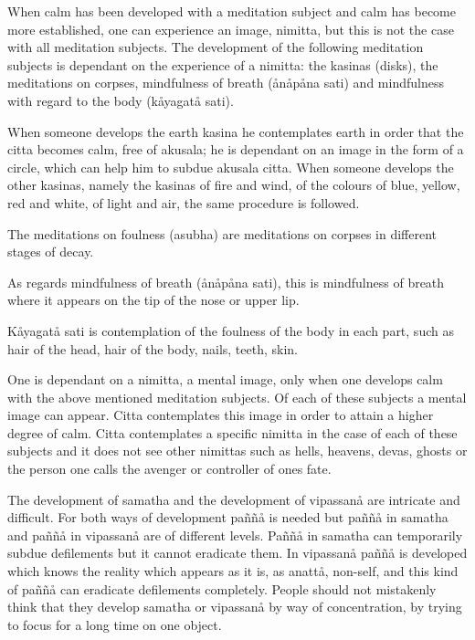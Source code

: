 \documentclass[12pt,twoside]{article}
\begin{document}
When calm has been developed with a meditation subject and calm has
become more established, one can experience an image, nimitta, but this
is not the case with all meditation subjects. The development of the
following meditation subjects is dependant on the experience of a
nimitta: the kasinas (disks), the meditations on corpses, mindfulness
of breath ({\aa}n{\aa}p{\aa}na sati) and mindfulness with regard to the
body (k{\aa}yagat{\aa} sati). 

When someone develops the earth kasina he contemplates earth in order
that the citta becomes calm, free of akusala; he is dependant on an
image in the form of a circle, which can help him to subdue akusala
citta. When someone develops the other kasinas, namely the kasinas of
fire and wind, of the colours of blue, yellow, red and white, of light
and air, the same procedure is followed. 

The meditations on foulness (asubha) are meditations on corpses in
different stages of decay. 

As regards mindfulness of breath ({\aa}n{\aa}p{\aa}na sati), this is
mindfulness of breath where it appears on the tip of the nose or upper
lip. 

K{\aa}yagat{\aa} sati is contemplation of the foulness of the body in
each part, such as hair of the head, hair of the body, nails, teeth,
skin. 

One is dependant on a
{\textasciigrave}{\textasciigrave}nimitta{\textquotesingle}{\textquotesingle},
a mental image, only when one develops calm with the above mentioned
meditation subjects. Of each of these subjects a mental image can
appear. Citta contemplates this image in order to attain a higher
degree of calm. Citta contemplates a specific nimitta in the case of
each of these subjects and it does not
{\textasciigrave}{\textasciigrave}see{\textquotesingle}{\textquotesingle}
other nimittas such as hells, heavens, devas, ghosts or the person one
calls the avenger or controller of one{\textquotesingle}s fate. 

The development of samatha and the development of vipassan{\aa} are
intricate and difficult. For both ways of development pa\~n\~n{\aa} is
needed but pa\~n\~n{\aa} in samatha and pa\~n\~n{\aa} in vipassan{\aa}
are of different levels. Pa\~n\~n{\aa} in samatha can temporarily
subdue defilements but it cannot eradicate them. In vipassan{\aa}
pa\~n\~n{\aa} is developed which knows the reality which appears as it
is, as anatt{\aa}, non{}-self, and this kind of pa\~n\~n{\aa} can
eradicate defilements completely. People should not mistakenly think
that they develop samatha or vipassan{\aa} by way of concentration, by
trying to focus for a long time on one object. 
\end{document}
